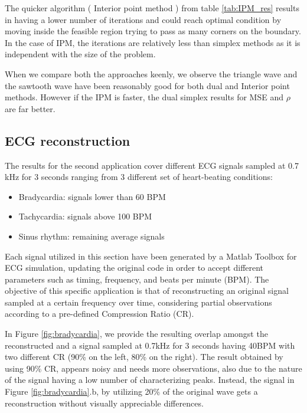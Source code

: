 \documentclass[journal,article,submit,electronics,pdftex]{Definitions/mdpi}
\begin{document}
{The quicker algorithm ( Interior point method ) from table \ref{tab:IPM_res} results in having a lower number of iterations and could reach optimal condition by moving inside the feasible region trying to pass as many corners on the boundary. In the case of IPM, the iterations are relatively less than simplex methods as it is independent with the size of the problem.

When we compare both the approaches keenly, we observe the triangle wave and the sawtooth wave have been reasonably good for both dual and Interior point methods. However if the IPM is faster, the dual simplex results for MSE and $\rho$ are far better.




\subsection{ECG reconstruction}

The results for the second application cover different ECG signals sampled at 0.7 kHz for 3 seconds ranging from 3 different set of heart-beating conditions:

\begin{itemize}
    \item Bradycardia: signals lower than 60 BPM
    \item Tachycardia: signals above 100 BPM
    \item Sinus rhythm: remaining average signals
\end{itemize}

Each signal utilized in this section have been generated by a Matlab Toolbox for ECG simulation, updating the original code in order to accept different parameters such as timing, frequency, and beats per minute (BPM).
The objective of this specific application is that of reconstructing an original signal sampled at a certain frequency over time, considering partial observations according to a pre-defined Compression Ratio (CR).

In Figure \ref{fig:bradycardia}, we provide the resulting overlap amongst the reconstructed and a signal sampled at 0.7kHz for 3 seconds having 40BPM with two different CR (90\% on the left, 80\% on the right). The result obtained by using 90\% CR, appears noisy and needs more observations, also due to the nature of the signal having a low number of characterizing peaks. Instead, the signal in Figure \ref{fig:bradycardia}.b, by utilizing 20\% of the original wave gets a reconstruction without visually appreciable differences.

}
\end{document}

